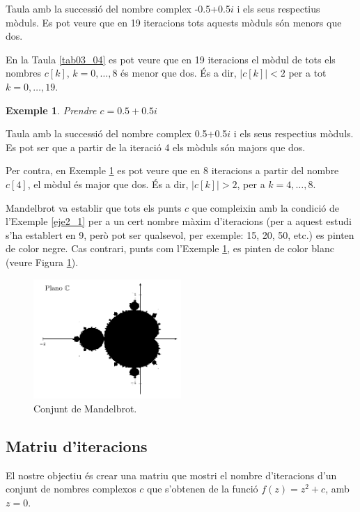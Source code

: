 \documentclass[12pt,a4paper]{report}
\newtheorem{eje}{Exemple}[chapter]
\begin{document}
\begin{table}[!ht]
\centering
{}
\caption{Taula amb la successió del nombre complex -0.5+0.5$i$ i els seus respectius mòduls. Es pot veure que en 19 iteracions tots aquests mòduls són menors que dos.}
\label{tab03_04}
\end{table}
En la Taula \ref{tab03_04} es pot veure que en 19 iteracions el mòdul de tots els nombres $c[k]$, $k=0,\ldots,8$ és menor que dos. És a dir, $|c[k]|<2$ per a tot $k=0,\ldots,19$.
\begin{eje}\label{eje2_2}
Prendre $c= 0.5 + 0.5i$
\end{eje}
{
}
\begin{table}[!ht]
\centering
{}
\caption{Taula amb la successió del nombre complex 0.5+0.5$i$ i els seus respectius mòduls. Es pot ser que a partir de la iteració 4 els mòduls són majors que dos.}
\label{tab03_05}
\end{table}
Per contra, en Exemple \ref{eje2_2} es pot veure que en 8 iteracions a partir del nombre $c[4]$, el mòdul és major que dos. És a dir, $|c[k]|>2$, per a $k=4,\ldots,8$.

Mandelbrot va establir que tots els punts $c$ que compleixin amb la condició de l'Exemple \ref{eje2_1} per a un cert nombre màxim d'iteracions (per a aquest estudi s'ha establert en 9, però pot ser qualsevol, per exemple: 15, 20, 50, etc.) es pinten de color negre. Cas contrari, punts com l'Exemple \ref{eje2_2}, es pinten de color blanc (veure Figura \ref{fig06_mandelbrot_bw}).

\begin{figure}[!ht]
\centering
\includegraphics[width=0.5\textwidth]{img/07_mandelbrot_bw}
\caption{Conjunt de Mandelbrot.}
\label{fig06_mandelbrot_bw}
\end{figure}

\subsection{Matriu d'iteracions}
El nostre objectiu és crear una matriu que mostri el nombre d'iteracions d'un conjunt de nombres complexos $c$ que s'obtenen de la funció $f(z)=z^{2}+c$, amb $z=0$.
\end{document}
